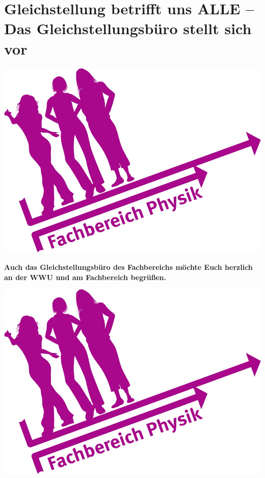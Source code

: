 \section[Gleichstellungsbüro am FB11]{Gleichstellung betrifft uns ALLE – Das Gleichstellungsbüro stellt sich vor}
\begin{minipage}{0.1\textwidth}
    \includegraphics[width=\textwidth]{res/gst_buero.jpg}
\end{minipage}\hfill
\begin{minipage}{0.75\textwidth}
    \centering
    \textbf{Auch das Gleichstellungsbüro des Fachbereichs möchte Euch herzlich an der WWU und am Fachbereich begrüßen.}
\end{minipage}\hfill
\begin{minipage}{0.1\textwidth}
    \includegraphics[width=\textwidth]{res/gst_buero.jpg}
\end{minipage}

